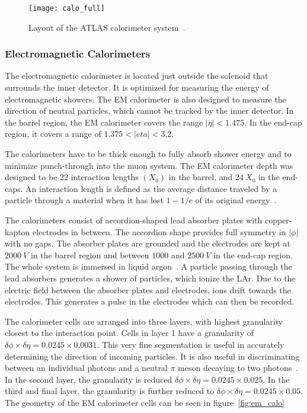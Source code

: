 \begin{figure}[!ht]\centering
\texttt{[image: calo\_full]}
\caption{Layout of the ATLAS calorimeter system~\cite{atlas-detector-2008}.}
\label{fig:calo_full}
\end{figure}

\subsubsection{Electromagnetic Calorimeters}\label{subsubsec:em_cal}

The electromagnetic calorimeter is located just outside the solenoid that surrounds the inner detector.
It is optimized for measuring the energy of electromagnetic showers.
The EM calorimeter is also designed to measure the direction of neutral particles, which cannot be tracked by the inner detector.
In the barrel region, the EM calorimeter covers the range $|\eta| < 1.475$.
In the end-cap region, it covers a range of $1.375 < |eta| < 3.2$.

The calorimeters have to be thick enough to fully absorb shower energy and to minimize punch-through into the muon system.
The EM calorimeter depth was designed to be 22 interaction lengths $\left(X_0\right)$ in the barrel, and $24~X_0$ in the end-caps.
An interaction length is defined as the average distance traveled by a particle through a material when it has lost
$1 - 1/\mathrm{e}$ of its original energy~\cite{em-calo}.

The calorimeters consist of accordion-shaped lead absorber plates with copper-kapton electrodes in between.
The accordion shape provides full symmetry in $|\phi|$ with no gaps.
The absorber plates are grounded and the electrodes are kept at $2000~V$ in the barrel region and between
$1000$ and $2500~V$ in the end-cap region.
The whole system is immersed in liquid argon~\cite{atlas-detector-2008}.
A particle passing through the lead absorbers generates a shower of particles, which ionize the LAr.
Due to the electric field between the absorber plates and electrodes, ions drift towards the electrodes.
This generates a pulse in the electrodes which can then be recorded.

The calorimeter cells are arranged into three layers, with highest granularity closest to the interaction point.
Cells in layer 1 have a granularity of $\delta\phi \times \delta\eta = 0.0245 \times 0.0031$.
This very fine segmentation is useful in accurately determining the direction of incoming particles.
It is also useful in discriminating between an individual photons and a neutral $\pi$ meson decaying to two photons~\cite{em-calo}.
In the second layer, the granularity is reduced $\delta\phi \times \delta\eta = 0.0245 \times 0.025$.
In the third and final layer, the granularity is further reduced to $\delta\phi \times \delta\eta = 0.0245 \times 0.05$.
The geometry of the EM calorimeter cells can be seen in figure~\ref{fig:em_calo}

